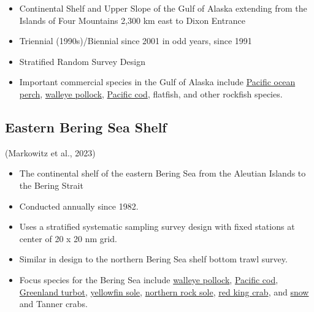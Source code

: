 \documentclass[
  letterpaper,
  oneside,
  open=any]{scrbook}
\providecommand{\tightlist}{%
  \setlength{\itemsep}{0pt}\setlength{\parskip}{0pt}}\usepackage{longtable,booktabs,array}
\begin{document}
\begin{itemize}
\tightlist
\item
  Continental Shelf and Upper Slope of the Gulf of Alaska extending from
  the Islands of Four Mountains 2,300 km east to Dixon Entrance
\item
  Triennial (1990s)/Biennial since 2001 in odd years, since 1991
\item
  Stratified Random Survey Design
\item
  Important commercial species in the Gulf of Alaska include
  \href{https://www.fisheries.noaa.gov/species/pacific-ocean-perch}{Pacific
  ocean perch},
  \href{https://www.fisheries.noaa.gov/species/alaska-pollock}{walleye
  pollock},
  \href{https://www.fisheries.noaa.gov/species/pacific-cod}{Pacific
  cod}, flatfish, and other rockfish species.
\end{itemize}

\hypertarget{eastern-bering-sea-shelf}{%
\subsection{\texorpdfstring{\textbf{Eastern Bering Sea
Shelf}}{Eastern Bering Sea Shelf}}\label{eastern-bering-sea-shelf}}

(Markowitz et al., 2023)

\begin{itemize}
\tightlist
\item
  The continental shelf of the eastern Bering Sea from the Aleutian
  Islands to the Bering Strait
\item
  Conducted annually since 1982.
\item
  Uses a stratified systematic sampling survey design with fixed
  stations at center of 20 x 20 nm grid.
\item
  Similar in design to the northern Bering Sea shelf bottom trawl
  survey.
\item
  Focus species for the Bering Sea include
  \href{https://www.fisheries.noaa.gov/species/alaska-pollock}{walleye
  pollock},
  \href{https://www.fisheries.noaa.gov/species/pacific-cod}{Pacific
  cod},
  \href{https://www.fisheries.noaa.gov/species/greenland-turbot}{Greenland
  turbot},
  \href{https://www.fisheries.noaa.gov/species/yellowfin-sole}{yellowfin
  sole},
  \href{https://www.fisheries.noaa.gov/species/rock-sole}{northern rock
  sole}, \href{https://www.fisheries.noaa.gov/species/red-king-crab}{red
  king crab}, and
  \href{https://www.fisheries.noaa.gov/species/alaska-snow-crab}{snow}
  and Tanner crabs.
\end{itemize}
\end{document}
